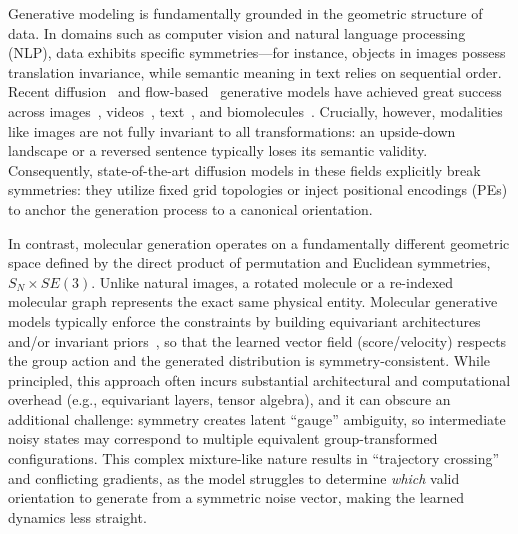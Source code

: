 \documentclass{article}
\theoremstyle{plain}
\theoremstyle{definition}
\theoremstyle{remark}
\newcommand{\1}{\mathbf{1}}
\begin{document}
Generative modeling is fundamentally grounded in the geometric structure of data. In domains such as computer vision and natural language processing (NLP), data exhibits specific symmetries—for instance, objects in images possess translation invariance, while semantic meaning in text relies on sequential order. 
Recent diffusion~\citep{GenerativeGradients,ho2020denoising,song2020score} and flow-based~\citep{liu2022flow,lipman2022flow,albergo2023stochastic} generative models have achieved great success across images~\citep{dhariwal2021diffusion,rombach2022high}, videos~\citep{ho2022video,singer2022make}, text~\citep{li2022diffusionlm,gong2022diffuseq}, and biomolecules~\citep{watson2023rfdiffusion,corso2023diffdock}. 
Crucially, however, modalities like images are not fully invariant to all transformations: an upside-down landscape or a reversed sentence typically loses its semantic validity. Consequently, state-of-the-art diffusion models in these fields explicitly break symmetries: they utilize fixed grid topologies or inject positional encodings (PEs) to anchor the generation process to a canonical orientation.

In contrast, molecular generation operates on a fundamentally different geometric space defined by the direct product of permutation and Euclidean symmetries, $S_N \times SE(3)$. Unlike natural images, a rotated molecule or a re-indexed molecular graph represents the exact same physical entity.
Molecular generative models typically enforce the constraints by building equivariant architectures and/or invariant priors~\citep{hoogeboom2022equivariant,xu2022geodiff,tian2024equiflowequivariantconditionalflow}, so that the learned vector field (score/velocity) respects the group action and the generated distribution is symmetry-consistent. While principled, this approach often incurs substantial architectural and computational overhead (e.g., equivariant layers, tensor algebra), and it can obscure an additional challenge: symmetry creates latent “gauge” ambiguity, so intermediate noisy states may correspond to multiple equivalent group-transformed configurations. This complex mixture-like nature results in  ``trajectory crossing” and conflicting gradients, as the model struggles to determine \textit{which} valid orientation to generate from a symmetric noise vector, making the learned dynamics less straight.
\end{document}

